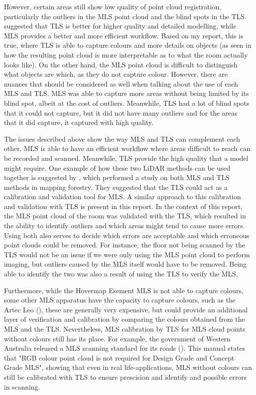 \documentclass[man]{apa7}
\begin{document}
However, certain areas still show low quality of point cloud registration, particularly the outliers in the MLS point cloud and the blind spots in the TLS. \Textcite{conti2024} suggested that TLS is better for higher quality and detailed modelling, while MLS provides a better and more efficient workflow. Based on my report, this is true, where TLS is able to capture colours and more details on objects (as seen in how the resulting point cloud is more interpretable as to what the room actually looks like). On the other hand, the MLS point cloud is difficult to distinguish what objects are which, as they do not capture colour. However, there are nuances that should be considered as well when talking about the use of each MLS and TLS. MLS was able to capture more areas without being limited by its blind spot, albeit at the cost of outliers. Meanwhile, TLS had a lot of blind spots that it could not capture, but it did not have many outliers and for the areas that it did capture, it captured with high quality. 

The issues described above show the way MLS and TLS can complement each other. MLS is able to have an efficient workflow where areas difficult to reach can be recorded and scanned. Meanwhile, TLS provide the high quality that a model might require. One example of how these two LiDAR methods can be used together is suggested by \Textcite{Levick2021}, which performed a study on both MLS and TLS methods in mapping forestry. They suggested that the TLS could act as a calibration and validation tool for MLS. A similar approach to this calibration and validation with TLS is present in this report. In the context of this report, the MLS point cloud of the room was validated with the TLS, which resulted in the ability to identify outliers and which areas might tend to cause more errors. Using both also serves to decide which errors are acceptable and which erroneous point clouds could be removed. For instance, the floor not being scanned by the TLS would not be an issue if we were only using the MLS point cloud to perform imaging, but outliers caused by the MLS itself would have to be removed. Being able to identify the two was also a result of using the TLS to verify the MLS.

Furthermore, while the Hovermap Esement MLS is not able to capture colours, some other MLS apparatus have the capacity to capture colours, such as the Artec Leo (\Textcite{artecleo}), these are generally very expensive, but could provide an additional layer of verification and calibration by comparing the colours obtained from the MLS and the TLS. Nevertheless, MLS calibration by TLS for MLS cloud points without colours still has its place. For example, the government of Western Australia released a MLS scanning standard for its roads (\Textcite{scanningStandard}). This manual states that "RGB colour point cloud is not required for Design Grade and Concept Grade MLS", showing that even in real life-applications, MLS without colours can still be calibrated with TLS to ensure prescision and identify and possible errors in scanning.
\end{document}
